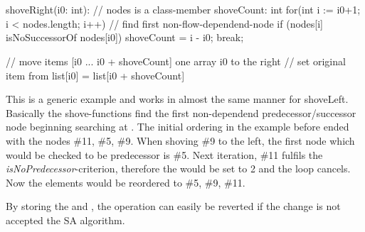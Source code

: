 \\ \\
shoveRight(i0: int):
	// nodes is a class-member
	shoveCount: int
	for(int i := i0+1; i < nodes.length; i++)
		// find first non-flow-dependend-node
		if (nodes[i] isNoSuccessorOf nodes[i0])
			shoveCount = i - i0;
			break;

	// move items  [i0 ... i0 + shoveCount] one array i0 to the right
	// set original item from list[i0] = list[i0 + shoveCount]

This is a generic example and works in almost the same manner for shoveLeft. Basically the shove-functions find the first non-dependend predecessor/successor node beginning searching at . The initial ordering in the example before ended with the nodes \#11, \#5, \#9. When shoving \#9 to the left, the first node which would be checked to be predecessor is \#5. Next iteration, \#11 fulfils the \textit{isNoPredecessor}-criterion, therefore the  would be set to 2 and the loop cancels. Now the elements would be reordered to \#5, \#9, \#11.\par
By storing the  and , the operation can easily be reverted if the change is not accepted the SA algorithm.
	
